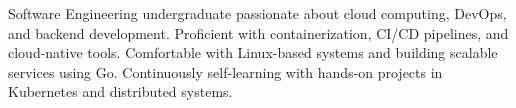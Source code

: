 
\begin{cvparagraph}

Software Engineering undergraduate passionate about cloud computing, DevOps, and backend development. Proficient with containerization, CI/CD pipelines, and cloud-native tools. Comfortable with Linux-based systems and building scalable services using Go. Continuously self-learning with hands-on projects in Kubernetes and distributed systems.

\end{cvparagraph}
